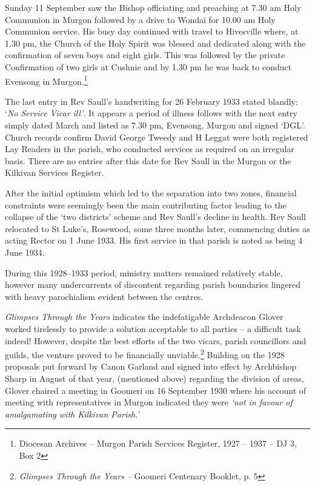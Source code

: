 Sunday 11 September saw the Bishop officiating and preaching at 7.30 am Holy Communion in Murgon followed by a drive to Wondai for 10.00 am Holy Communion service. His busy day continued with travel to Hivesville where, at 1.30 pm, the Church of the Holy Spirit was blessed and dedicated along with the confirmation of seven boys and eight girls. This was followed by the private Confirmation of two girls at Cushnie and by 1.30 pm he was back to conduct Evensong in Murgon.\footnote{Diocesan Archives -- Murgon Parish Services Register, 1927 -- 1937 -- DJ 3, Box 2}


The last entry in Rev Saull's handwriting for 26 February 1933 stated blandly: `\emph{No Service Vicar ill'}. It appears a period of illness follows with the next entry simply dated March and listed as 7.30 pm, Evensong, Murgon and signed `DGL'. Church records confirm David George Tweedy and H Leggat were both registered Lay Readers in the parish, who conducted services as required on an irregular basis. There are no entries after this date for Rev Saull in the Murgon or the Kilkivan Services Register.



After the initial optimism which led to the separation into two zones, financial constraints were seemingly been the main contributing factor leading to the collapse of the `two districts' scheme and Rev Saull's decline in health. Rev Saull relocated to St Luke's, Rosewood, some three months later, commencing duties as acting Rector on 1 June 1933. His first service in that parish is noted as being 4 June 1934.



During this 1928--1933 period, ministry matters remained relatively stable, however many undercurrents of discontent regarding parish boundaries lingered with heavy parochialism evident between the centres.



\emph{Glimpses Through the Years} indicates the indefatigable Archdeacon Glover worked tirelessly to provide a solution acceptable to all parties -- a difficult task indeed! However, despite the best efforts of the two vicars, parish councillors and guilds, the venture proved to be financially unviable.\footnote{\emph{Glimpses Through the Years --} Goomeri Centenary Booklet, p. 5} Building on the 1928 proposals put forward by Canon Garland and signed into effect by Archbishop Sharp in August of that year, (mentioned above) regarding the division of areas, Glover chaired a meeting in Goomeri on 16 September 1930 where his account of meeting with representatives in Murgon indicated they were \emph{`not in favour of amalgamating with Kilkivan Parish.'}


